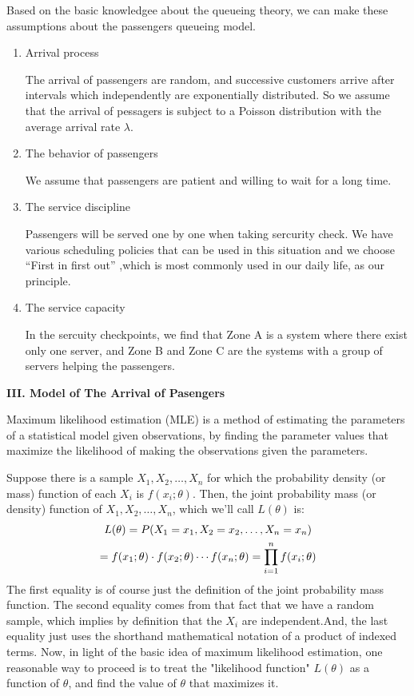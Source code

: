 \documentclass{mcmthesis}
\begin{document}
	Based on the basic knowledgee about the queueing theory, we can make these assumptions about the passengers queueing model.
		\begin{enumerate}
			\item Arrival process
			
			 The arrival of passengers are random, and successive customers arrive after intervals which independently are exponentially distributed. So we assume that the arrival of pessagers is subject to a Poisson distribution with the average arrival rate ${\lambda}$.
			\item The behavior of passengers 
			
			 We assume that passengers are patient and willing to wait for a long time.
			\item The service discipline 
			
			 Passengers will be served one by one when taking sercurity check. We have various scheduling policies that can be used in this situation and we choose ``First in first out'' ,which is most commonly used in our daily life, as our principle.
			\item The service capacity 
			
			 In the sercuity checkpoints, we find that Zone A is a system where there exist only one server, and Zone B and Zone C are the systems with a group of servers helping the passengers.
		\end{enumerate}	

	\par{\bf III. Model of The Arrival of Pasengers} \label{flag1.1} %
		\par Maximum likelihood estimation (MLE) is a method of estimating the parameters of a statistical model given observations, by finding the parameter values that maximize the likelihood of making the observations given the parameters. 

		Suppose there is a sample ${X_1,X_2,\dots,X_n}$ for which the probability density (or mass) function of each ${X_i}$ is ${f(x_i;\theta)}$.  Then, the joint probability mass (or density) function of ${X_1,X_2,\dots,X_n}$, which we'll call ${L(\theta)}$ is:
			\begin{gather}
				L( \theta) = P(X_1 = x_1, X_2 = x_2, \dots, X_n = x_n) \notag \\
				= f(x_1; \theta)\cdot f(x_2; \theta) \cdots f(x_n; \theta) = \prod_{i=1}^{n}f(x_i; \theta) \label{flag1}
			\end{gather}
		The first equality is of course just the definition of the joint probability mass function. The second equality comes from that fact that we have a random sample, which implies by definition that the ${X_i}$ are independent.And, the last equality just uses the shorthand mathematical notation of a product of indexed terms. Now, in light of the basic idea of maximum likelihood estimation, one reasonable way to proceed is to treat the "likelihood function" ${L(\theta)}$ as a function of ${\theta}$, and find the value of ${\theta}$ that maximizes it.
\end{document}
